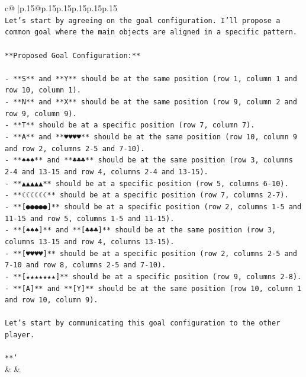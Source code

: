 \documentclass{article}
\begin{document}
{\begin{supertabular}{c@{$\;$}|p{.15\linewidth}@{}p{.15\linewidth}p{.15\linewidth}p{.15\linewidth}p{.15\linewidth}p{.15\linewidth}}
{{{\\ 
\texttt{Let's start by agreeing on the goal configuration. I'll propose a common goal where the main objects are aligned in a specific pattern.} \\
\\ 
\texttt{**Proposed Goal Configuration:**} \\
\\ 
\texttt{{-} **S** and **Y** should be at the same position (row 1, column 1 and row 10, column 1).} \\
\texttt{{-} **N** and **X** should be at the same position (row 9, column 2 and row 9, column 9).} \\
\texttt{{-} **T** should be at a specific position (row 7, column 7).} \\
\texttt{{-} **A** and **♥♥♥♥** should be at the same position (row 10, column 9 and row 2, columns 2{-}5 and 7{-}10).} \\
\texttt{{-} **♠♠♠** and **♣♣♣** should be at the same position (row 3, columns 2{-}4 and 13{-}15 and row 4, columns 2{-}4 and 13{-}15).} \\
\texttt{{-} **▲▲▲▲▲** should be at a specific position (row 5, columns 6{-}10).} \\
\texttt{{-} **☾☾☾☾☾☾** should be at a specific position (row 7, columns 2{-}7).} \\
\texttt{{-} **{[}●●●●●{]}** should be at a specific position (row 2, columns 1{-}5 and 11{-}15 and row 5, columns 1{-}5 and 11{-}15).} \\
\texttt{{-} **{[}♠♠♠{]}** and **{[}♣♣♣{]}** should be at the same position (row 3, columns 13{-}15 and row 4, columns 13{-}15).} \\
\texttt{{-} **{[}♥♥♥♥{]}** should be at a specific position (row 2, columns 2{-}5 and 7{-}10 and row 8, columns 2{-}5 and 7{-}10).} \\
\texttt{{-} **{[}★★★★★★★{]}** should be at a specific position (row 9, columns 2{-}8).} \\
\texttt{{-} **{[}A{]}** and **{[}Y{]}** should be at the same position (row 10, column 1 and row 10, column 9).} \\
\\ 
\texttt{Let's start by communicating this goal configuration to the other player.} \\
\\ 
\texttt{**'} \\
            }
        }
    }
    & & \\ \\


\end{supertabular}}
\end{document}
